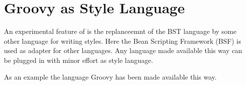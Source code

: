 
\section{Groovy as Style Language}

An experimental feature of \ExBib{} is the replanceemnt of the BST
language by some other language for writing styles. Here the Bean
Scripting Framework (BSF) is used as adapter for other languages. Any
language made available this way can be plugged in with minor effort
as style language.

As an example the language Groovy has been made available this way.



\endinput%
%
